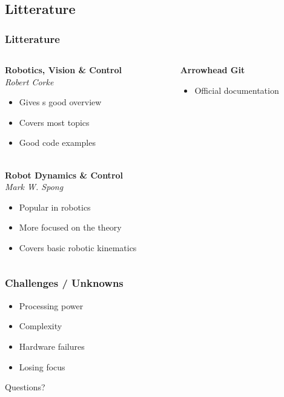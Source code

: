 \documentclass{beamer}
\begin{document}
\begin{frame}
    \subsection{Litterature}
    \frametitle{Litterature}

    \begin{columns}
        \begin{column}[]{0.5\textwidth}
            \textbf{Robotics, Vision \& Control }\\
            \textit{Robert Corke}
            \begin{itemize}
                \item Gives s good overview
                \item Covers most topics
                \item Good code examples\\~\
            \end{itemize}
            \textbf{Robot Dynamics \& Control}\\
            \textit{Mark W. Spong}
            \begin{itemize}
                \item Popular in robotics
                \item More focused on the theory
                \item Covers basic robotic kinematics
            \end{itemize}

        \end{column}
        
        \begin{column}[]{.5\textwidth}
            \textbf{Arrowhead Git}
            \begin{itemize}
                \item Official documentation
            \end{itemize}
        \end{column}
        

    \end{columns}
\end{frame}



\begin{frame}
    \frametitle{Challenges / Unknowns}
    \begin{itemize}
        \item Processing power
        \item Complexity
        \item Hardware failures
        \item Losing focus 
    \end{itemize}
\end{frame}

\begin{frame}
    \begin{center}
        \Huge Questions?
    \end{center}
\end{frame}
\end{document}
